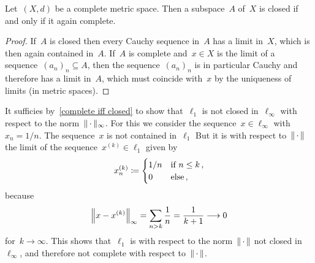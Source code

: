 \begin{lemma}
  \label{complete iff closed}
  Let~$(X,d)$ be a complete metric space.
  Then a subspace~$A$ of~$X$ is closed if and only if it again complete.
\end{lemma}


\begin{proof}
  If~$A$ is closed then every Cauchy sequence in~$A$ has a limit in~$X$, which is then again contained in~$A$.
  If~$A$ is complete and~$x \in X$ is the limit of a sequence~$(a_n)_n \subseteq A$, then the sequence~$(a_n)_n$ is in particular Cauchy and therefore has a limit in~$A$, which must coincide with~$x$ by the uniqueness of limits (in metric spaces).
\end{proof}


It sufficies by~\cref{complete iff closed} to show that~$\ell_1$ is not closed in~$\ell_\infty$ with respect to the norm~$\norm{\,\cdot\,}_\infty$.
For this we consider the sequence~$x \in \ell_\infty$ with~$x_n = 1/n$.
The sequence~$x$ is not contained in~$\ell_1$
But it is with respect to~$\norm{\,\cdot\,}$ the limit of the sequence~$x^{(k)} \in \ell_1$ given by
\[
              x^{(k)}_n
    \defined  \begin{cases}
                1/n & \text{if~$n \leq k$} \,,  \\
                0   & \text{else} \,,
              \end{cases}
\]
because
\[
          \norm*{x - x^{(k)}}_\infty
  =       \sum_{n > k} \frac{1}{n}
  =       \frac{1}{k+1}
  \longto 0
\]
for~$k \to \infty$.
This shows that~$\ell_1$ is with respect to the norm~$\norm{\,\cdot\,}$ not closed in~$\ell_\infty$, and therefore not complete with respect to~$\norm{\,\cdot\,}$.
